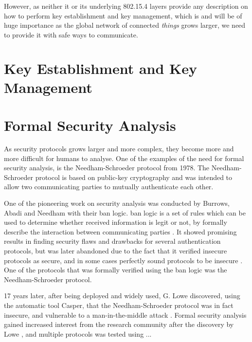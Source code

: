 However, as neither it or its underlying 802.15.4 layers provide any description on how to perform key establishment and key management, which is and will be of huge importance as the global network of connected \emph{things} grows larger, we need to provide it with safe ways to communicate.


\section{Key Establishment and Key Management}


\section{Formal Security Analysis} 


As security protocols grows larger and more complex, they become more and more difficult for humans to analyse. One of the examples of the need for formal security analysis, is the Needham-Schroeder protocol \cite{Needham:1978} from 1978. The Needham-Schroeder protocol is based on public-key cryptography and was intended to allow two communicating parties to mutually authenticate each other.


One of the pioneering work on security analysis was conducted by Burrows, Abadi and Needham with their \gls{ban} logic. \gls{ban} logic is a set of rules which can be used to determine whether received information is legit or not, by formally describe the interaction between communicating parties \cite{burrows1989logic}. It showed promising results in finding security flaws and drawbacks for several authentication protocols, but was later abandoned due to the fact that it verified insecure protocols as secure, and in some cases perfectly sound protocols to be insecure \cite{boyd1993}. One of the protocols that was formally verified using the \gls{ban} logic was the Needham-Schroeder protocol.


17 years later, after being deployed and widely used, G. Lowe discovered, using the automatic tool Casper, that the Needham-Schroeder protocol was in fact insecure, and vulnerable to a man-in-the-middle attack \cite{basin2011model} \cite{lowe1996}. Formal security analysis gained increased interest from the research community after the discovery by Lowe \cite{cremers2009comparing}, and multiple protocols was tested using ...



